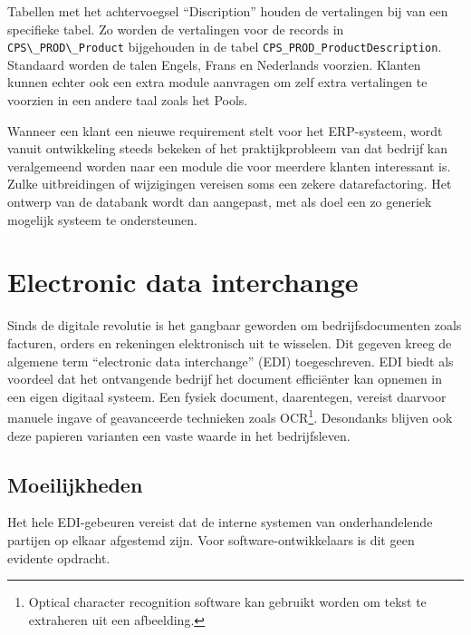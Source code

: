 Tabellen met het achtervoegsel ``Discription'' houden de vertalingen bij van een specifieke tabel. Zo worden de vertalingen voor de records in \verb*|CPS\_PROD\_Product| bijgehouden in de tabel \verb*|CPS_PROD_ProductDescription|. Standaard worden de talen Engels, Frans en Nederlands voorzien. Klanten kunnen echter ook een extra module aanvragen om zelf extra vertalingen te voorzien in een andere taal zoals het Pools.

Wanneer een klant een nieuwe requirement stelt voor het ERP-systeem, wordt vanuit ontwikkeling steeds bekeken of het praktijkprobleem van dat bedrijf kan veralgemeend worden naar een module die voor meerdere klanten interessant is. Zulke uitbreidingen of wijzigingen vereisen soms een zekere datarefactoring. Het ontwerp van de databank wordt dan aangepast, met als doel een zo generiek mogelijk systeem te ondersteunen. 


\section{Electronic data interchange}
\label{sec:electronic-data-interchange}
Sinds de digitale revolutie is het gangbaar geworden om bedrijfsdocumenten zoals facturen, orders en rekeningen elektronisch uit te wisselen. Dit gegeven kreeg de algemene term ``electronic data interchange'' (EDI) toegeschreven. 
EDI biedt als voordeel dat het ontvangende bedrijf het document efficiënter kan opnemen in een eigen digitaal systeem. Een fysiek document, daarentegen, vereist daarvoor manuele ingave of geavanceerde technieken zoals OCR\footnote{Optical character recognition software kan gebruikt worden om tekst te extraheren uit een afbeelding.}. Desondanks blijven ook deze papieren varianten een vaste waarde in het bedrijfsleven.

\subsection{Moeilijkheden}

Het hele EDI-gebeuren vereist dat de interne systemen van onderhandelende partijen op elkaar afgestemd zijn. Voor software-ontwikkelaars is dit geen evidente opdracht. 

